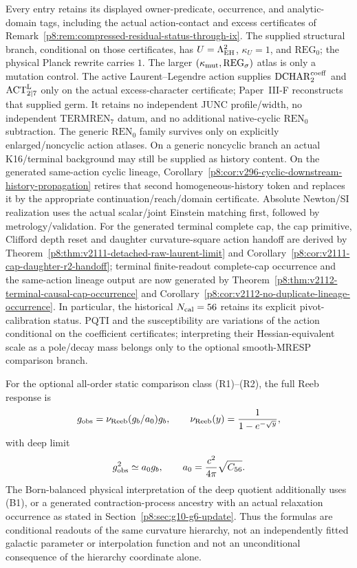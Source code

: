 \documentclass[12pt,a4paper]{article}
\begin{document}
Every entry retains its displayed owner-predicate, occurrence, and
analytic-domain tags, including the actual action-contact and excess
certificates of Remark~\ref{p8:rem:compressed-residual-status-through-ix}.
The supplied structural branch, conditional on those certificates, has
\(U=\Lambda_{\rm EH}^2\), \(\kappa_U=1\), and \(\mathrm{REG}_0\); the
physical Planck rewrite carries \(1\).  The larger
\((\kappa_{\rm mut},\mathrm{REG}_\sigma)\) atlas is only a mutation control.
The active Laurent--Legendre action supplies
\(\mathrm{DCHAR}_{2}^{\rm coeff}\) and
\(\mathrm{ACT}_{2\mid7}^{\rm L}\) only on the actual excess-character
certificate; Paper~III-F reconstructs that supplied germ.  It retains no independent JUNC profile/width, no independent
\(\mathrm{TERMREN}_7\) datum, and no additional native-cyclic \(\mathrm{REN}_0\)
subtraction.  The generic \(\mathrm{REN}_0\) family survives only on explicitly
enlarged/noncyclic action atlases.  On a generic noncyclic branch an actual
K16/terminal background may still be supplied as history content.  On the generated same-action cyclic lineage, Corollary~\ref{p8:cor:v296-cyclic-downstream-history-propagation}
retires that second homogeneous-history token and replaces it by the
appropriate continuation/reach/domain certificate.  Absolute Newton/SI realization uses the actual scalar/joint Einstein
matching first, followed by metrology/validation.  For the generated terminal complete cap, the cap primitive, Clifford depth reset and daughter
curvature-square action handoff are derived by
Theorem~\ref{p8:thm:v2111-detached-raw-laurent-limit} and
Corollary~\ref{p8:cor:v2111-cap-daughter-r2-handoff}; terminal finite-readout
complete-cap occurrence and the same-action lineage output are now generated by
Theorem~\ref{p8:thm:v2112-terminal-causal-cap-occurrence} and
Corollary~\ref{p8:cor:v2112-no-duplicate-lineage-occurrence}.  In particular, the historical \(N_{\rm cal}=56\) retains its
explicit pivot-calibration status. PQTI and the susceptibility are
variations of the action conditional on the coefficient certificates; interpreting their Hessian-equivalent scale as a pole/decay mass
belongs only to the optional smooth-MRESP comparison branch.

For the optional all-order static comparison class (R1)--(R2), the full Reeb response is
\[
g_{\rm obs}=\nu_{\rm Reeb}(g_b/a_0)g_b,
\qquad
\nu_{\rm Reeb}(y)=\frac{1}{1-e^{-\sqrt y}},
\]
with deep limit
\[
g_{\rm obs}^2\simeq a_0g_b,
\qquad
a_0=\frac{c^2}{4\pi}\sqrt{C_{56}}.
\]
The Born-balanced physical interpretation of the deep quotient additionally
uses (B1), or a generated contraction-process ancestry with an actual
relaxation occurrence as stated in Section~\ref{p8:sec:g10-g6-update}.  Thus
the formulas are conditional readouts of the same curvature hierarchy, not an
independently fitted galactic parameter or interpolation function and not an
unconditional consequence of the hierarchy coordinate alone.
\end{document}
